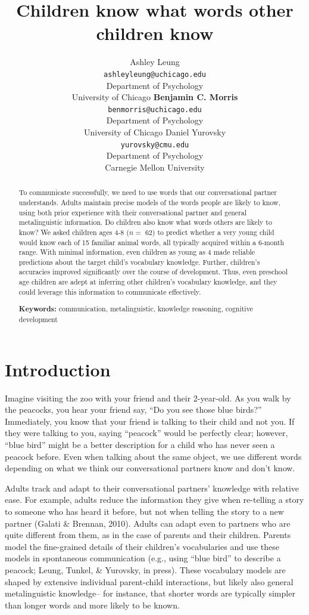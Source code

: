 \documentclass[10pt, letterpaper]{article}
\title{Children know what words other children know}
\author{Ashley Leung \\
     \texttt{ashleyleung@uchicago.edu} \\
    Department of Psychology \\ University of Chicago
\And \textbf{Benjamin C. Morris} \\
     \texttt{benmorris@uchicago.edu} \\
    Department of Psychology \\ University of Chicago
\And Daniel Yurovsky \\
     \texttt{yurovsky@cmu.edu} \\
    Department of Psychology \\ Carnegie Mellon University}
\begin{document}
\maketitle

\begin{abstract}
To communicate successfully, we need to use words that our
conversational partner understands. Adults maintain precise models of
the words people are likely to know, using both prior experience with
their conversational partner and general metalinguistic information. Do
children also know what words others are likely to know? We asked
children ages 4-8 (\(n =\) 62) to predict whether a very young child
would know each of 15 familiar animal words, all typically acquired
within a 6-month range. With minimal information, even children as young
as 4 made reliable predictions about the target child's vocabulary
knowledge. Further, children's accuracies improved significantly over
the course of development. Thus, even preschool age children are adept
at inferring other children's vocabulary knowledge, and they could
leverage this information to communicate effectively.

\textbf{Keywords:}
communication, metalinguistic, knowledge reasoning, cognitive
development
\end{abstract}

\hypertarget{introduction}{%
\section{Introduction}\label{introduction}}

Imagine visiting the zoo with your friend and their 2-year-old. As you
walk by the peacocks, you hear your friend say, ``Do you see those blue
birds?'' Immediately, you know that your friend is talking to their
child and not you. If they were talking to you, saying ``peacock'' would
be perfectly clear; however, ``blue bird'' might be a better description
for a child who has never seen a peacock before. Even when talking about
the same object, we use different words depending on what we think our
conversational partners know and don't know.

Adults track and adapt to their conversational partners' knowledge with
relative ease. For example, adults reduce the information they give when
re-telling a story to someone who has heard it before, but not when
telling the story to a new partner (Galati \& Brennan, 2010). Adults can
adapt even to partners who are quite different from them, as in the case
of parents and their children. Parents model the fine-grained details of
their children's vocabularies and use these models in spontaneous
communication (e.g., using ``blue bird'' to describe a peacock; Leung,
Tunkel, \& Yurovsky, in press). These vocabulary models are shaped by
extensive individual parent-child interactions, but likely also general
metalinguistic knowledge-- for instance, that shorter words are
typically simpler than longer words and more likely to be known.
\end{document}
